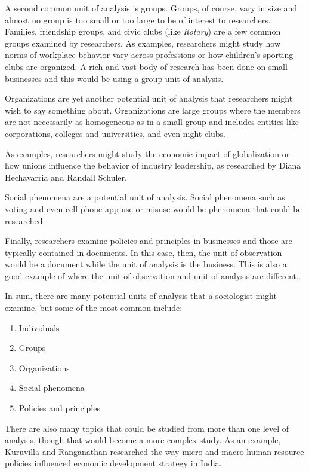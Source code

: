 A second common unit of analysis is groups. Groups, of course, vary in size and almost no group is too small or too large to be of interest to researchers. Families, friendship groups, and civic clubs (like \textit{Rotary}) are a few common groups examined by researchers. As examples, researchers might study how norms of workplace behavior vary across professions or how children's sporting clubs are organized. A rich and vast body of research has been done on small businesses and this would be using a group unit of analysis\cite{yusuf1995critical}\cite{huck1991competencies}.

Organizations are yet another potential unit of analysis that researchers might wish to say something about. Organizations are large groups where the members are not necessarily as homogeneous as in a small group and includes entities like corporations, colleges and universities, and even night clubs.

As examples, researchers might study the economic impact of globalization or how unions influence the behavior of industry leadership, as researched by Diana Hechavarria\cite{hechavarria2009cultural} and Randall Schuler\cite{schuler1998understanding}.

Social phenomena are a potential unit of analysis. Social phenomena such as voting and even cell phone app use or misuse would be phenomena that could be researched.

Finally, researchers examine policies and principles in businesses and those are typically contained in documents. In this case, then, the unit of observation would be a document while the unit of analysis is the business. This is also a good example of where the unit of observation and unit of analysis are different.

In sum, there are many potential units of analysis that a sociologist might examine, but some of the most common include:

\begin{enumerate}
	\item Individuals
	\item Groups
	\item Organizations
	\item Social phenomena
	\item Policies and principles
\end{enumerate}

There are also many topics that could be studied from more than one level of analysis, though that would become a more complex study. As an example, Kuruvilla and Ranganathan researched the way micro and macro human resource policies influenced economic development strategy in India\cite{kuruvilla2008economic}.

